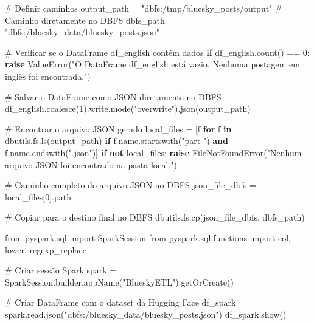 \documentclass[
  letterpaper,
  DIV=11,
  numbers=noendperiod]{scrartcl}
\newenvironment{Shaded}{\begin{snugshade}}{\end{snugshade}}
\newcommand{\CommentTok}[1]{\textcolor[rgb]{0.37,0.37,0.37}{#1}}
\newcommand{\ControlFlowTok}[1]{\textcolor[rgb]{0.00,0.23,0.31}{\textbf{#1}}}
\newcommand{\DecValTok}[1]{\textcolor[rgb]{0.68,0.00,0.00}{#1}}
\newcommand{\ImportTok}[1]{\textcolor[rgb]{0.00,0.46,0.62}{#1}}
\newcommand{\KeywordTok}[1]{\textcolor[rgb]{0.00,0.23,0.31}{\textbf{#1}}}
\newcommand{\NormalTok}[1]{\textcolor[rgb]{0.00,0.23,0.31}{#1}}
\newcommand{\OperatorTok}[1]{\textcolor[rgb]{0.37,0.37,0.37}{#1}}
\newcommand{\PreprocessorTok}[1]{\textcolor[rgb]{0.68,0.00,0.00}{#1}}
\newcommand{\StringTok}[1]{\textcolor[rgb]{0.13,0.47,0.30}{#1}}
\begin{document}
\begin{Shaded}
\begin{Highlighting}[]
\CommentTok{\# Definir caminhos}
\NormalTok{output\_path }\OperatorTok{=} \StringTok{"dbfs:/tmp/bluesky\_posts/output"}  \CommentTok{\# Caminho diretamente no DBFS}
\NormalTok{dbfs\_path }\OperatorTok{=} \StringTok{"dbfs:/bluesky\_data/bluesky\_posts.json"}

\CommentTok{\# Verificar se o DataFrame df\_english contém dados}
\ControlFlowTok{if}\NormalTok{ df\_english.count() }\OperatorTok{==} \DecValTok{0}\NormalTok{:}
    \ControlFlowTok{raise} \PreprocessorTok{ValueError}\NormalTok{(}\StringTok{"O DataFrame df\_english está vazio. Nenhuma postagem em inglês foi encontrada."}\NormalTok{)}

\CommentTok{\# Salvar o DataFrame como JSON diretamente no DBFS}
\NormalTok{df\_english.coalesce(}\DecValTok{1}\NormalTok{).write.mode(}\StringTok{"overwrite"}\NormalTok{).json(output\_path)}

\CommentTok{\# Encontrar o arquivo JSON gerado}
\NormalTok{local\_files }\OperatorTok{=}\NormalTok{ [f }\ControlFlowTok{for}\NormalTok{ f }\KeywordTok{in}\NormalTok{ dbutils.fs.ls(output\_path) }\ControlFlowTok{if}\NormalTok{ f.name.startswith(}\StringTok{"part{-}"}\NormalTok{) }\KeywordTok{and}\NormalTok{ f.name.endswith(}\StringTok{".json"}\NormalTok{)]}
\ControlFlowTok{if} \KeywordTok{not}\NormalTok{ local\_files:}
    \ControlFlowTok{raise} \PreprocessorTok{FileNotFoundError}\NormalTok{(}\StringTok{"Nenhum arquivo JSON foi encontrado na pasta local."}\NormalTok{)}

\CommentTok{\# Caminho completo do arquivo JSON no DBFS}
\NormalTok{json\_file\_dbfs }\OperatorTok{=}\NormalTok{ local\_files[}\DecValTok{0}\NormalTok{].path}

\CommentTok{\# Copiar para o destino final no DBFS}
\NormalTok{dbutils.fs.cp(json\_file\_dbfs, dbfs\_path)}
\end{Highlighting}
\end{Shaded}

\begin{Shaded}
\begin{Highlighting}[]
\ImportTok{from}\NormalTok{ pyspark.sql }\ImportTok{import}\NormalTok{ SparkSession}
\ImportTok{from}\NormalTok{ pyspark.sql.functions }\ImportTok{import}\NormalTok{ col, lower, regexp\_replace}

\CommentTok{\# Criar sessão Spark}
\NormalTok{spark }\OperatorTok{=}\NormalTok{ SparkSession.builder.appName(}\StringTok{"BlueskyETL"}\NormalTok{).getOrCreate()}

\CommentTok{\# Criar DataFrame com o dataset da Hugging Face}
\NormalTok{df\_spark }\OperatorTok{=}\NormalTok{ spark.read.json(}\StringTok{"dbfs:/bluesky\_data/bluesky\_posts.json"}\NormalTok{)}
\NormalTok{df\_spark.show()}
\end{Highlighting}
\end{Shaded}
\end{document}
